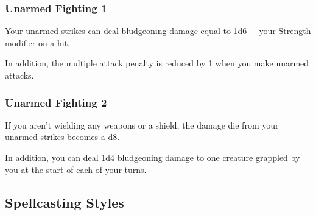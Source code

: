 \subsubsection{Unarmed Fighting 1}
    Your unarmed strikes can deal bludgeoning damage equal to 1d6 + your Strength modifier on a hit.

    In addition, the multiple attack penalty is reduced by 1 when you make unarmed attacks.
\subsubsection{Unarmed Fighting 2}
    If you aren't wielding any weapons or a shield, the damage die from your unarmed strikes becomes a d8.

    In addition, you can deal 1d4 bludgeoning damage to one creature grappled by you at the start of each of your turns.

\subsection*{Spellcasting Styles} \label{ssec::spellcastingstyles}


